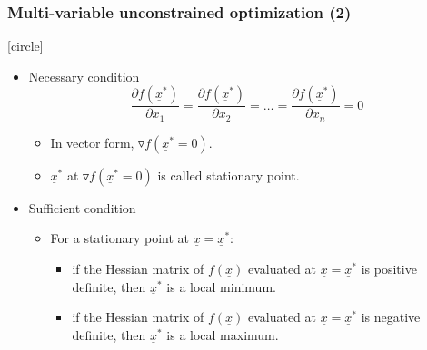 \documentclass{beamer}
\begin{document}
\begin{frame}
    \frametitle{Multi-variable unconstrained optimization (2)}
    [circle]
    \begin{itemize}
        \item Necessary condition
        $$\frac{\partial f(\underline{x}^*)}{\partial x_1}=
            \frac{\partial f(\underline{x}^*)}{\partial x_2}=
            \dots=
            \frac{\partial f(\underline{x}^*)}{\partial x_n}=0$$
        \begin{itemize}
            \item In vector form, $\triangledown f(\underline{x}^*=0)$.
            \item $\underline{x}^*$ at $\triangledown f(\underline{x}^*=0)$ is called stationary point.
        \end{itemize}
        \item Sufficient condition
        \begin{itemize}
            \item For a stationary point at $\underline{x}=\underline{x}^*$:
            \begin{itemize}
                \item if the Hessian matrix of $f(\underline{x})$ evaluated at $\underline{x}=\underline{x}^*$ is \alert{positive definite}, then $\underline{x}^*$ is a local minimum. 
                \item if the Hessian matrix of $f(\underline{x})$ evaluated at $\underline{x}=\underline{x}^*$ is \alert{negative definite}, then $\underline{x}^*$ is a local maximum. 
            \end{itemize}
        \end{itemize}
    \end{itemize}

\end{frame}
\end{document}
